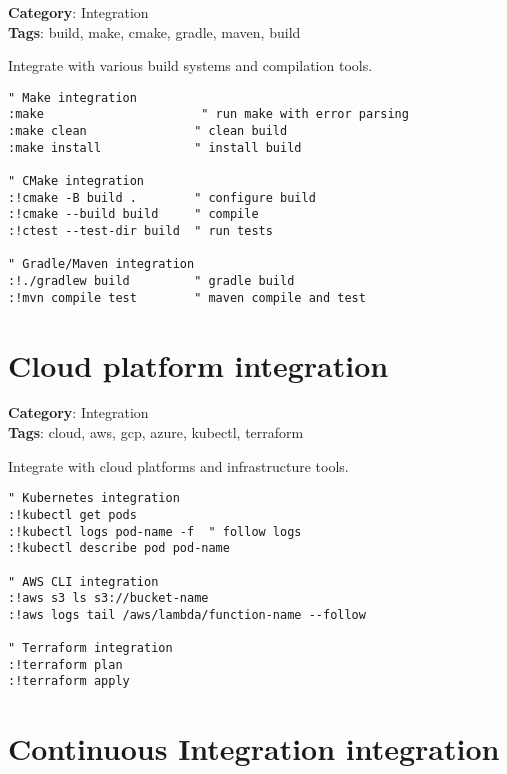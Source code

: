 {{{{{{\textbf{Category}: Integration\\ \textbf{Tags}: build, make, cmake, gradle, maven, build
\vspace{0.5cm}

Integrate with various build systems and compilation tools.

\begin{Exa*}{}
\begin{Verbatim}[fontsize=\footnotesize, breaklines, breakanywhere]
" Make integration
:make                      " run make with error parsing
:make clean               " clean build
:make install             " install build

" CMake integration  
:!cmake -B build .        " configure build
:!cmake --build build     " compile
:!ctest --test-dir build  " run tests

" Gradle/Maven integration
:!./gradlew build         " gradle build
:!mvn compile test        " maven compile and test
\end{Verbatim}
\end{Exa*}

\section{Cloud platform integration}

\textbf{Category}: Integration\\ \textbf{Tags}: cloud, aws, gcp, azure, kubectl, terraform
\vspace{0.5cm}

Integrate with cloud platforms and infrastructure tools.

\begin{Exa*}{}
\begin{Verbatim}[fontsize=\footnotesize, breaklines, breakanywhere]
" Kubernetes integration
:!kubectl get pods
:!kubectl logs pod-name -f  " follow logs
:!kubectl describe pod pod-name

" AWS CLI integration
:!aws s3 ls s3://bucket-name
:!aws logs tail /aws/lambda/function-name --follow

" Terraform integration
:!terraform plan
:!terraform apply
\end{Verbatim}
\end{Exa*}

\section{Continuous Integration integration}

}}}}}}

